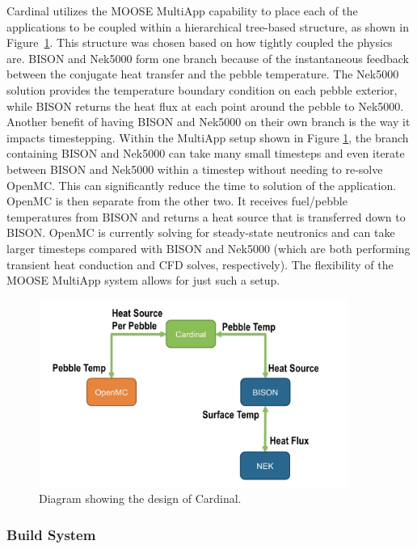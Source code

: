 Cardinal utilizes the MOOSE MultiApp capability to place each of the applications to be coupled within a hierarchical tree-based structure, as shown in Figure~\ref{f:cardinal}. This structure was chosen based on how tightly coupled the physics are. BISON and Nek5000 form one branch because of the instantaneous feedback between the conjugate heat transfer and the pebble temperature. The Nek5000 solution provides the temperature boundary condition on each pebble exterior, while BISON returns the heat flux at each point around the pebble to Nek5000. Another benefit of having BISON and Nek5000 on their own branch is the way it impacts timestepping. Within the MultiApp setup shown in Figure \ref{f:cardinal}, the branch containing BISON and Nek5000 can take many small timesteps and even iterate between BISON and Nek5000 within a timestep without needing to re-solve OpenMC. This can significantly reduce the time to solution of the application. OpenMC is then separate from the other two. It receives fuel/pebble temperatures from BISON and returns a heat source that is transferred down to BISON. OpenMC is currently solving for steady-state neutronics and can take larger timesteps compared with BISON and Nek5000 (which are both performing transient heat conduction and CFD solves, respectively). The flexibility of the MOOSE MultiApp system allows for just such a setup.

\begin{figure}[!h]
\centering
\includegraphics[clip=true,width=0.9\textwidth]{Figures/cardinal}
\caption{Diagram showing the design of Cardinal.}
\label{f:cardinal}
\end{figure}

\subsubsection{Build System}
\label{ss:c2}

